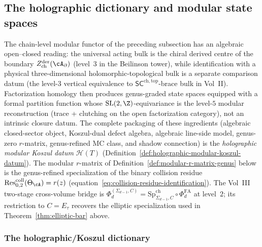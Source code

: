 
\subsection{The holographic dictionary and modular state spaces}
\label{subsec:holographic-dictionary}

The chain-level modular functor of the preceding subsection has an
algebraic open--closed reading: the universal acting bulk is the
chiral derived centre of the boundary
$Z^{\mathrm{der}}_{\mathrm{ch}}(\cA_\partial)$ (level~$3$ in the
Beilinson tower), while identification with a physical
three-dimensional holomorphic-topological bulk is a separate
comparison datum (the level-$3$ vertical equivalence to
$\mathsf{SC}^{\mathrm{ch,top}}$-brace bulk in Vol~II). Factorization
homology then produces genus-graded state spaces equipped with a
formal partition function whose $\mathrm{SL}(2,\Z)$-equivariance is
the level-$5$ modular reconstruction (trace + clutching on the open
factorization category), not an intrinsic closure datum.
The complete packaging of these ingredients (algebraic closed-sector
object, Koszul-dual defect algebra, algebraic line-side model,
genus-zero $r$-matrix, genus-refined MC class, and shadow connection)
is the \emph{holographic modular Koszul datum} $\mathcal{H}(T)$
(Definition~\ref{def:holographic-modular-koszul-datum}). The modular
$r$-matrix of Definition~\ref{def:modular-r-matrix-genus} below is the
genus-refined specialization of the binary collision residue
$\operatorname{Res}^{\mathrm{coll}}_{0,2}(\Theta_\cA) = r(z)$
(equation~\eqref{eq:collision-residue-identification}). The Vol~III
two-stage cross-volume bridge is
$\Phi_d^{(\Sigma_{d-1},C)}=\mathrm{Sp}^{\mathrm{ch}}_{\Sigma_{d-1},C}\circ
\Phi_d^{\mathrm{FA}}$ at level~$2$; its restriction to
$C=E_\tau$ recovers the elliptic specialization used in
Theorem~\ref{thm:elliptic-bar} above.

\subsubsection{The holographic/Koszul dictionary}

